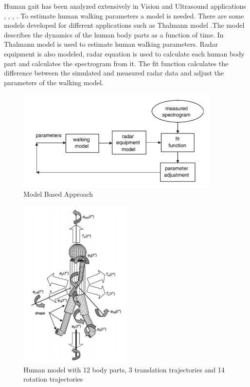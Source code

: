 Human gait has been analyzed extensively in Vision and Ultrasound applications \cite{Littel2003497}, \cite{LeeGaitAnalyze}, \cite{wan2018survey}, \cite{NixonAutomaticgait}. To estimate human walking parameters a model is needed. There are some models developed for different applications such as Thalmann model \cite{Thalman}.The model describes the dynamics of the human body parts as a function of time. In \cite{VanDorp} Thalmann model is used to estimate human walking parameters. Radar equipment is also modeled, radar equation is used to calculate each human body part and calculates the spectrogram from it. The fit function calculates the difference between the simulated and measured radar data and adjust the parameters of the walking model.
\begin{figure}
  \includegraphics[width=0.9\textwidth]{Figures/ModelBasedApproach.PNG}
  \caption{Model Based Approach\cite{VanDorp}}
  \label{fig:ModelBasedApproach}
\end{figure}

\begin{figure}
  \includegraphics[width=0.5\textwidth]{Figures/HumanModel.PNG}
  \caption{Human model with 12 body parts, 3 translation
trajectories and 14 rotation trajectories\cite{VanDorp}}
  \label{fig:HumanModel}
\end{figure}